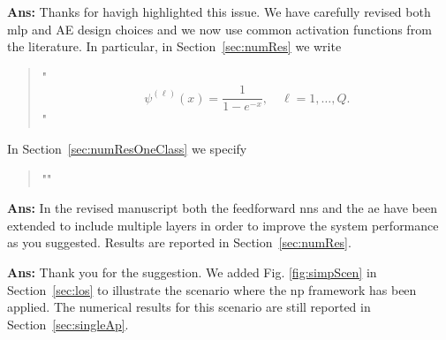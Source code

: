 \documentclass[draftcls,onecolumn,12pt]{IEEEtran}
\newcounter{revc}
\newcommand{\revp}[1]{\zref[revcontent]{#1}}
\begin{document}
{\bf Ans:} 
Thanks for havigh highlighted this issue. We have carefully revised both \ac{mlp} and AE design choices and we now use common activation functions from the literature. In particular, in Section~\ref{sec:numRes} we write

\begin{quote}
    "\revp{activation}
    \begin{equation*}
\psi^{(\ell)}(x) = \frac{1}{1-e^{-x}}, \quad \ell = 1, \ldots, Q.
\end{equation*}"
    
\end{quote}

In Section~\ref{sec:numResOneClass} we specify
\begin{quote}
"\revp{designAE}"
\end{quote}

\vspace{5mm} %
\begin{framed}
\end{framed}

{\bf Ans:} In the revised manuscript both the feedforward \acp{nn} and the \ac{ae} have been extended to include multiple layers in order to improve the system performance as you suggested. Results are reported in Section~\ref{sec:numRes}.

\vspace{5mm} %
\begin{framed}
\end{framed}

{\bf Ans:} Thank you for the suggestion. We added Fig. \ref{fig:simpScen} in Section~\ref{sec:los} to illustrate the scenario where the \ac{np} framework has been applied. The numerical results for this scenario are still reported in Section~\ref{sec:singleAp}. 

\vspace{5mm} %
\begin{framed}
\end{framed}
\end{document}
